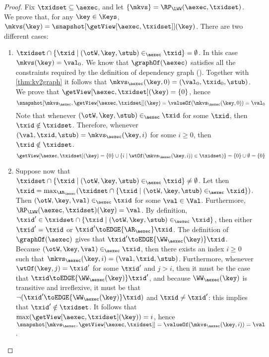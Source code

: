 \begin{proof}
Fix $\txidset \subseteq \aexec$, and let $\{\mkvs\} = \RP_{\LWW}(\aexec, \txidset)$. We prove that, for any $\key \in \Keys$, 
$\mkvs(\key) = \snapshot[\getView[\aexec, \txidset]](\key)$. There are two different cases: 
\begin{enumerate}
\item $\txidset \cap \{ \txid \mid (\otW, \key, \stub) \in_{\aexec} \txid \} = \emptyset$. 
In this case $\mkvs(\key) = \val_0$. 
We know that $\graphOf(\aexec)$ satisfies all the constraints required by the definition of dependency graph 
(\cite{laws}). Together with \cref{thm:kv2graph} it follows that $\mkvs_{\aexec}(\key, 0) = (\val_0, \txid_0, \stub)$.
We prove that $\getView[\aexec, \txidset](\key) = \{0\}$, 
hence 
\[ 
\snapshot[\mkvs_{\aexec}, \getView[\aexec, \txidset]](\key) = \valueOf(\mkvs_{\aexec}(\key, 0)) = \val_{0}
\]
Note that whenever $(\otW, \key, \stub) \in_{\aexec} \txid$ for some $\txid$, then 
$\txid \notin \txidset$. Therefore, whenever $(\val, \txid, \stub) = \mkvs_{\aexec}(\key, i)$ for some $i \geq 0$, then 
$\txid \notin \txidset$.
\[
\getView[\aexec, \txidset](\key) = \{0\} \cup \{i \mid \wtOf(\mkvs_{\aexec}(\key, i)) \in \txidset)\} = \{0\} \cup \emptyset = \{0\}
\]
\item Suppose now that $\txidset \cap \{ \txid \mid (\otW, \key, \stub) \in_{\aexec} \txid \} \neq \emptyset$. 
Let then $\txid = \max_{\AR_{\aexec}}(\txidset \cap \{\txid \mid (\otW, \key, \stub) \in_{\aexec} \txid\})$. 
Then $(\otW, \key, \val) \in_{\aexec} \txid$ for some $\val \in \Val$. Furthermore, $\RP_{\LWW}(\aexec, \txidset)(\key) = \val$.
By definition, $\txid' \in \txidset \cap \{ \txid \mid (\otW, \key, \stub) \in_{\aexec} \txid\}$, 
then either $\txid' = \txid$ or $\txid' \toEDGE{\AR_{\aexec}} \txid$. The definition of 
$\graphOf(\aexec)$ gives that $\txid' \toEDGE{\WW_{\aexec}(\key)} \txid$. 
Because $(\otW, \key, \val) \in_{\aexec} \txid$, then there exists an index 
$i \geq 0$ such that $\mkvs_{\aexec}(\key, i) = (\val, \txid, \stub)$. Furthermore, 
whenever $\wtOf(\key, j) = \txid'$ for some $\txid'$ and $j > i$, then it must 
be the case that $\txid \toEDGE{\WW_{\aexec}(\key)} \txid'$, and because 
$\WW_{\aexec}(\key)$ is transitive and irreflexive, it must be that  
$\neg( \txid' \toEDGE{\WW_{\aexec}(\key)} \txid)$ and $\txid \neq \txid'$: this implies that 
$\txid' \notin \txidset$. It follows that $\max(\getView[\aexec, \txidset](\key)) = i$, hence 
$\snapshot[\mkvs_{\aexec}, \getView[\aexec, \txidset]] = \valueOf(\mkvs_{\aexec}(\key, i)) = \val$.
\end{enumerate}
\end{proof}

